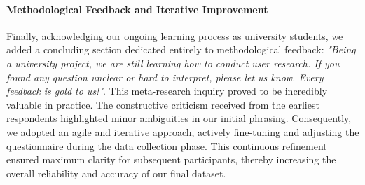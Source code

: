 \paragraph{Methodological Feedback and Iterative Improvement}
Finally, acknowledging our ongoing learning process as university students, we added a concluding section dedicated entirely to methodological feedback: \textit{"Being a university project, we are still learning how to conduct user research. If you found any question unclear or hard to interpret, please let us know. Every feedback is gold to us!"}. This meta-research inquiry proved to be incredibly valuable in practice. The constructive criticism received from the earliest respondents highlighted minor ambiguities in our initial phrasing. Consequently, we adopted an agile and iterative approach, actively fine-tuning and adjusting the questionnaire during the data collection phase. This continuous refinement ensured maximum clarity for subsequent participants, thereby increasing the overall reliability and accuracy of our final dataset.
